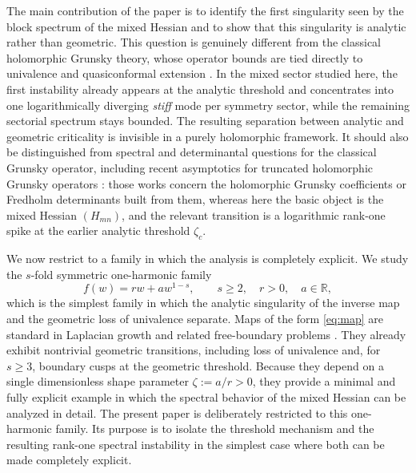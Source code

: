 \documentclass[11pt]{amsart}
\numberwithin{equation}{section}
\theoremstyle{plain}
\theoremstyle{definition}
\theoremstyle{remark}
\newcommand{\R}{\mathbb{R}}
\begin{document}
The main contribution of the paper is to identify the first singularity seen
by the block spectrum of the mixed Hessian and to show that this singularity
is analytic rather than geometric. This question is genuinely different from
the classical holomorphic Grunsky theory, whose operator bounds are tied
directly to univalence and quasiconformal extension
\cite{Pommerenke1992,Duren1983}. In the mixed sector studied here, the first instability already appears at the
analytic threshold and concentrates into one logarithmically diverging
\emph{stiff} mode per symmetry sector, while the remaining sectorial spectrum
stays bounded. The resulting
separation between analytic and geometric criticality is invisible in a
purely holomorphic framework. It should also be distinguished from spectral
and determinantal questions for the classical Grunsky operator, including
recent asymptotics for truncated holomorphic Grunsky operators
\cite{Schiffer1981,Shen2010,JohanssonViklund2023}: those works concern the
holomorphic Grunsky coefficients or Fredholm determinants built from them, whereas
here the basic object is the mixed Hessian \((H_{mn})\), and the relevant
transition is a logarithmic rank-one spike at the earlier analytic threshold
\(\zeta_c\).

We now restrict to a family in which the analysis is completely explicit. We
study the \(s\)-fold symmetric one-harmonic family
\begin{equation}\label{eq:map}
	f(w)=rw+aw^{1-s},
	\qquad
	s\ge2,\quad r>0,\quad a\in\R,
\end{equation}
which is the simplest family in which the analytic singularity of the inverse
map and the geometric loss of univalence separate. Maps of the form
\eqref{eq:map} are standard in Laplacian growth and related free-boundary
problems \cite{GustafssonLin2013}. They already exhibit nontrivial geometric
transitions, including loss of univalence and, for \(s\ge3\), boundary cusps
at the geometric threshold. Because they depend on a single dimensionless
shape parameter \(\zeta:=a/r>0\), they provide a minimal and fully explicit
example in which the spectral behavior of the mixed Hessian can be analyzed in
detail. The present paper is deliberately restricted to this one-harmonic
family. Its purpose is to isolate the threshold mechanism and the resulting
rank-one spectral instability in the simplest case where both can be made
completely explicit.
\end{document}

